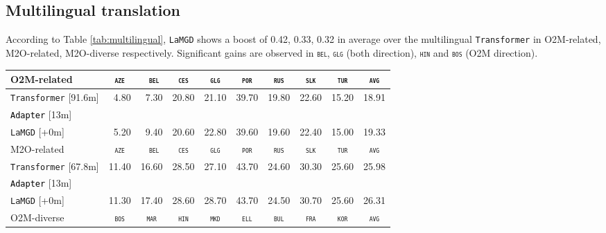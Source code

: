 \documentclass[11pt]{article}
\newcommand{\revision}[1]{\textcolor{black}{#1}}
\newcommand{\domain}[1]{\texttt{\textsc{#1}}}
\newcommand{\system}[1]{\texttt{{#1}}}
\begin{document}
\subsection{Multilingual translation}
According to Table \ref{tab:multilingual}, \system{LaMGD} shows a boost of 0.42, 0.33, 0.32 in average over the multilingual \system{Transformer} in O2M-related, M2O-related, M2O-diverse respectively. Significant gains are observed in \domain{bel}, \domain{glg} (both direction), \domain{hin} and \domain{bos} (O2M direction).
\begin{table*}[ht]
  \centering
  \begin{tabular}{|p{4cm}|*{9}{r|}} \hline
    O2M-related & \multicolumn{1}{c|}{\domain{aze}} & \multicolumn{1}{c|}{\domain{ bel}} & \multicolumn{1}{c|}{\domain{ces}} & \multicolumn{1}{c|}{\domain{glg}} & \multicolumn{1}{c|}{\domain{por}} & \multicolumn{1}{c|}{\domain{rus}} & \multicolumn{1}{c|}{\domain{slk}} & \multicolumn{1}{c|}{\domain{tur}} & \multicolumn{1}{c|}{\domain{avg}} \\ \hline 
    \system{Transformer}  \hfill{\footnotesize[91.6m]} & 4.80 &7.30&20.80&21.10&39.70&19.80&22.60&15.20&18.91 \\
    \revision{\system{Adapter}}   \hfill{\footnotesize[13m]} & & & & & & & & & \\ 
    \system{LaMGD}  \hfill{\footnotesize[+0m]}  & 5.20&9.40&20.60&22.80&39.60&19.60&22.40&15.00&19.33 \\ 
	\hline
    \hline
    M2O-related & \multicolumn{1}{c|}{\domain{aze}} & \multicolumn{1}{c|}{\domain{ bel}} & \multicolumn{1}{c|}{\domain{ces}} & \multicolumn{1}{c|}{\domain{glg}} & \multicolumn{1}{c|}{\domain{por}} & \multicolumn{1}{c|}{\domain{rus}} & \multicolumn{1}{c|}{\domain{slk}} & \multicolumn{1}{c|}{\domain{tur}} & \multicolumn{1}{c|}{\domain{avg}} \\ \hline 
    \system{Transformer}  \hfill{\footnotesize[67.8m]} &11.40&16.60&28.50&	27.10&43.70&24.60&30.30&25.60&25.98 \\
    \revision{\system{Adapter}}   \hfill{\footnotesize[13m]} & & & & & & & & & \\ 
    \system{LaMGD}   \hfill{\footnotesize[+0m]}  &11.30&17.40&28.60&28.70&	43.70&24.50&30.70&25.60&26.31 \\ 
    \hline
    \hline
    O2M-diverse & \multicolumn{1}{c|}{\domain{bos}} & \multicolumn{1}{c|}{\domain{mar}} & \multicolumn{1}{c|}{\domain{hin}} & \multicolumn{1}{c|}{\domain{mkd}} & \multicolumn{1}{c|}{\domain{ell}} & \multicolumn{1}{c|}{\domain{bul}} & \multicolumn{1}{c|}{\domain{fra}} & \multicolumn{1}{c|}{\domain{kor}} & \multicolumn{1}{c|}{\domain{avg}} \\ \hline 

\end{tabular}
\end{table*}
\end{document}

